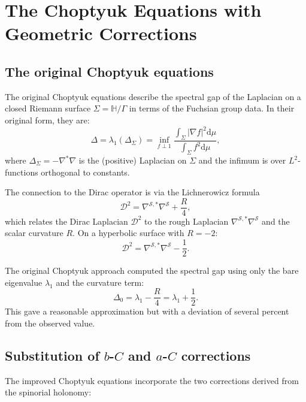 \documentclass[12pt,a4paper]{article}
\theoremstyle{definition}
\theoremstyle{remark}
\newcommand{\HH}{\mathbb{H}}
\newcommand{\cD}{\mathcal{D}}
\newcommand{\cS}{\mathcal{S}}
\newcommand{\dd}{\mathrm{d}}
\begin{document}
\section{The Choptyuk Equations with Geometric Corrections}
\label{sec:choptyuk}

\subsection{The original Choptyuk equations}

The original Choptyuk equations describe the spectral gap of the Laplacian on a closed Riemann surface $\Sigma = \HH/\Gamma$ in terms of the Fuchsian group data. In their original form, they are:
\begin{equation}
\Delta = \lambda_1(\Delta_\Sigma) = \inf_{f \perp 1} \frac{\int_\Sigma |\nabla f|^2 \dd\mu}{\int_\Sigma f^2 \dd\mu},
\end{equation}
where $\Delta_\Sigma = -\nabla^*\nabla$ is the (positive) Laplacian on $\Sigma$ and the infimum is over $L^2$-functions orthogonal to constants.

The connection to the Dirac operator is via the Lichnerowicz formula
\begin{equation}
\cD^2 = \nabla^{\cS,*}\nabla^{\cS} + \frac{R}{4},
\end{equation}
which relates the Dirac Laplacian $\cD^2$ to the rough Laplacian $\nabla^{\cS,*}\nabla^{\cS}$ and the scalar curvature $R$. On a hyperbolic surface with $R = -2$:
\begin{equation}
\cD^2 = \nabla^{\cS,*}\nabla^{\cS} - \frac{1}{2}.
\end{equation}

The original Choptyuk approach computed the spectral gap using only the bare eigenvalue $\lambda_1$ and the curvature term:
\begin{equation}
\Delta_0 = \lambda_1 - \frac{R}{4} = \lambda_1 + \frac{1}{2}.
\end{equation}
This gave a reasonable approximation but with a deviation of several percent from the observed value.

\subsection{Substitution of $b$-$C$ and $a$-$C$ corrections}

The improved Choptyuk equations incorporate the two corrections derived from the spinorial holonomy:
\end{document}
